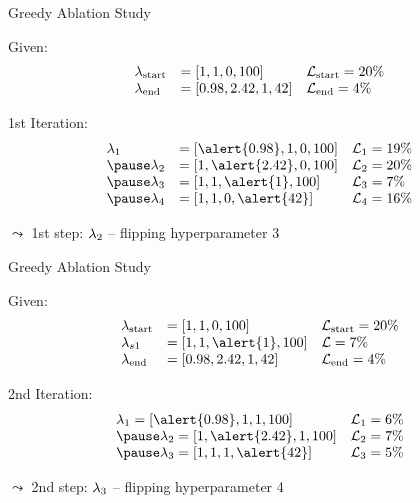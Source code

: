 \begin{frame}[c]{Greedy Ablation Study}

Given:
\begin{eqnarray}
\begin{array}{lll}
\mathbf{\lambda}_{\text{start}} &= [1, 1, 0, 100] & \mathcal{L}_{\text{start}} = 20\% \nonumber\\
\mathbf{\lambda}_{\text{end}} &= [0.98, 2.42, 1, 42]  & \mathcal{L}_{\text{end}} = 4\% \nonumber
\end{array}
\end{eqnarray}

\pause
1st Iteration:
\begin{eqnarray}
\begin{array}{lll}
\conf_1& = [\alert{0.98}, 1, 0, 100] & \loss_1 = 19\% \nonumber\\
\pause
\conf_2 &= [1, \alert{2.42}, 0, 100] & \loss_2 = 20\% \nonumber\\
\pause
\conf_3 &= [1, 1, \alert{1}, 100] & \loss_3 = 7\% \nonumber\\
\pause
\conf_4 &= [1, 1, 0, \alert{42}] & \loss_4 = 16\% \nonumber\\
\end{array}
\end{eqnarray}

\pause
$\leadsto$ 1st step: $\mathbf{\lambda}_2$ -- flipping hyperparameter 3


\end{frame}
\begin{frame}[c]{Greedy Ablation Study}

Given:
\begin{eqnarray}
\begin{array}{lll}
\conf_{\text{start}} &= [1, 1, 0, 100] & \loss_{\text{start}} = 20\% \nonumber\\
\conf_{s1} &= [1, 1, \alert{1}, 100]  & \loss = 7\% \nonumber\\
\conf_{\text{end}} &= [0.98, 2.42, 1, 42]  & \loss_{\text{end}} = 4\% \nonumber
\end{array}
\end{eqnarray}

2nd Iteration:
\begin{eqnarray}
\begin{array}{ll}
\conf_1 = [\alert{0.98}, 1, 1, 100] & \loss_1 = 6\% \nonumber\\
\pause
\conf_2 = [1, \alert{2.42}, 1, 100] & \loss_2 = 7\% \nonumber\\
\pause
\conf_3 = [1, 1, 1, \alert{42}] & \loss_3 = 5\% \nonumber\\
\end{array}
\end{eqnarray}

$\leadsto$ 2nd step: $\mathbf{\lambda}_3$ -- flipping hyperparameter 4

\end{frame}
